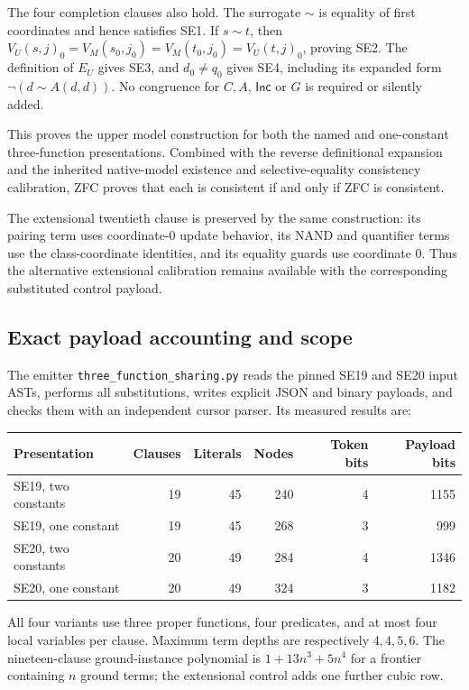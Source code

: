 The four completion clauses also hold.  The surrogate $\sim$ is
equality of first coordinates and hence satisfies SE1.  If $s\sim t$,
then $V_U(s,j)_0=V_M(s_0,j_0)=V_M(t_0,j_0)=V_U(t,j)_0$, proving SE2.
The definition of $E_U$ gives SE3, and $d_0\ne q_0$ gives SE4, including
its expanded form $\neg(d\sim A(d,d))$.  No congruence for $C,A$,
$\mathsf{Inc}$ or $G$ is required or silently added.

This proves the upper model construction for both the named and
one-constant three-function presentations.  Combined with the reverse
definitional expansion and the inherited native-model existence and
selective-equality consistency calibration, ZFC proves that each is
consistent if and only if ZFC is consistent.

The extensional twentieth clause is preserved by the same construction:
its pairing term uses coordinate-0 update behavior, its NAND and
quantifier terms use the class-coordinate identities, and its equality
guards use coordinate 0.  Thus the alternative extensional calibration
remains available with the corresponding substituted control payload.

\subsection{Exact payload accounting and scope}

The emitter \texttt{three\_function\_sharing.py} reads the pinned SE19
and SE20 input ASTs, performs all substitutions, writes explicit JSON
and binary payloads, and checks them with an independent cursor parser.
Its measured results are:
\begin{center}
\begin{tabular}{lrrrrr}
\toprule
Presentation & Clauses & Literals & Nodes & Token bits & Payload bits\\
\midrule
SE19, two constants &19&45&240&4&1155\\
SE19, one constant &19&45&268&3&999\\
SE20, two constants &20&49&284&4&1346\\
SE20, one constant &20&49&324&3&1182\\
\bottomrule
\end{tabular}
\end{center}
All four variants use three proper functions, four predicates, and at
most four local variables per clause.  Maximum term depths are
respectively $4,4,5,6$.  The nineteen-clause ground-instance polynomial
is $1+13n^3+5n^4$ for a frontier containing $n$ ground terms; the
extensional control adds one further cubic row.

